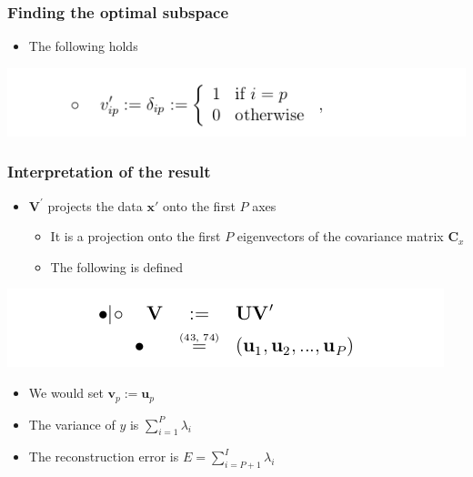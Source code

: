 \documentclass[11pt]{article}
\begin{document}
\subsubsection{Finding the optimal subspace}
\label{sec:org0ae5d15}
\begin{itemize}
\item The following holds
\end{itemize}
\begin{center}
\includegraphics[width=.9\linewidth]{Principal Component Analysis/screenshot_2018-11-20_22-18-36.png}
\end{center}

\subsubsection{Interpretation of the result}
\label{sec:orgfe537d6}
\begin{itemize}
\item \(\pmb V ^'\) projects the data \(\pmb x'\) onto the first \(P\) axes
\begin{itemize}
\item It is a projection onto the first \(P\) eigenvectors of the covariance matrix \(\pmb C_x\)
\item The following is defined
\end{itemize}
\end{itemize}
\begin{center}
\includegraphics[width=.9\linewidth]{Principal Component Analysis/screenshot_2018-11-20_22-25-48.png}
\end{center}
\begin{itemize}
\item We would set \(\pmb v_p := \pmb u_p\)
\item The variance of \(y\) is \(\sum_{i=1}^P \lambda_i\)
\item The reconstruction error is \(E = \sum_{i=P+1}^I \lambda_i\)
\end{itemize}
\end{document}
